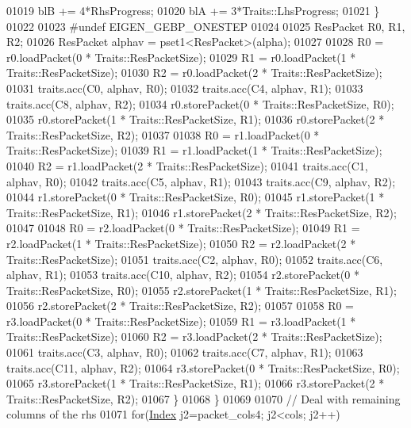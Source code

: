 \begin{DoxyCode}
01019             blB += 4*RhsProgress;
01020             blA += 3*Traits::LhsProgress;
01021           \}
01022 
01023 \textcolor{preprocessor}{#undef EIGEN\_GEBP\_ONESTEP}
01024 
01025           ResPacket R0, R1, R2;
01026           ResPacket alphav = pset1<ResPacket>(alpha);
01027 
01028           R0 = r0.loadPacket(0 * Traits::ResPacketSize);
01029           R1 = r0.loadPacket(1 * Traits::ResPacketSize);
01030           R2 = r0.loadPacket(2 * Traits::ResPacketSize);
01031           traits.acc(C0, alphav, R0);
01032           traits.acc(C4, alphav, R1);
01033           traits.acc(C8, alphav, R2);
01034           r0.storePacket(0 * Traits::ResPacketSize, R0);
01035           r0.storePacket(1 * Traits::ResPacketSize, R1);
01036           r0.storePacket(2 * Traits::ResPacketSize, R2);
01037 
01038           R0 = r1.loadPacket(0 * Traits::ResPacketSize);
01039           R1 = r1.loadPacket(1 * Traits::ResPacketSize);
01040           R2 = r1.loadPacket(2 * Traits::ResPacketSize);
01041           traits.acc(C1, alphav, R0);
01042           traits.acc(C5, alphav, R1);
01043           traits.acc(C9, alphav, R2);
01044           r1.storePacket(0 * Traits::ResPacketSize, R0);
01045           r1.storePacket(1 * Traits::ResPacketSize, R1);
01046           r1.storePacket(2 * Traits::ResPacketSize, R2);
01047 
01048           R0 = r2.loadPacket(0 * Traits::ResPacketSize);
01049           R1 = r2.loadPacket(1 * Traits::ResPacketSize);
01050           R2 = r2.loadPacket(2 * Traits::ResPacketSize);
01051           traits.acc(C2, alphav, R0);
01052           traits.acc(C6, alphav, R1);
01053           traits.acc(C10, alphav, R2);
01054           r2.storePacket(0 * Traits::ResPacketSize, R0);
01055           r2.storePacket(1 * Traits::ResPacketSize, R1);
01056           r2.storePacket(2 * Traits::ResPacketSize, R2);
01057 
01058           R0 = r3.loadPacket(0 * Traits::ResPacketSize);
01059           R1 = r3.loadPacket(1 * Traits::ResPacketSize);
01060           R2 = r3.loadPacket(2 * Traits::ResPacketSize);
01061           traits.acc(C3, alphav, R0);
01062           traits.acc(C7, alphav, R1);
01063           traits.acc(C11, alphav, R2);
01064           r3.storePacket(0 * Traits::ResPacketSize, R0);
01065           r3.storePacket(1 * Traits::ResPacketSize, R1);
01066           r3.storePacket(2 * Traits::ResPacketSize, R2);          
01067           \}
01068         \}
01069 
01070         \textcolor{comment}{// Deal with remaining columns of the rhs}
01071         \textcolor{keywordflow}{for}(\hyperlink{namespace_eigen_a62e77e0933482dafde8fe197d9a2cfde}{Index} j2=packet\_cols4; j2<cols; j2++)

\end{DoxyCode}
